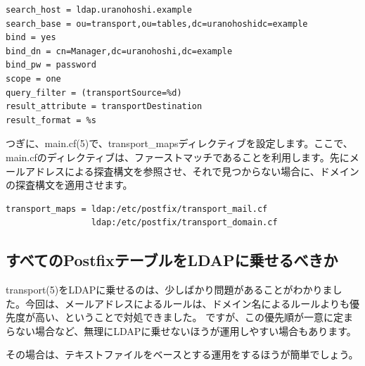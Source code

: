 \begin{verbatim}
search_host = ldap.uranohoshi.example
search_base = ou=transport,ou=tables,dc=uranohoshidc=example
bind = yes
bind_dn = cn=Manager,dc=uranohoshi,dc=example
bind_pw = password
scope = one
query_filter = (transportSource=%d)
result_attribute = transportDestination
result_format = %s
\end{verbatim}

つぎに、main.cf(5)で、transport\_mapsディレクティブを設定します。ここで、main.cfのディレクティブは、ファーストマッチであることを利用します。先にメールアドレスによる探査構文を参照させ、それで見つからない場合に、ドメインの探査構文を適用させます。

\begin{verbatim}
transport_maps = ldap:/etc/postfix/transport_mail.cf
                 ldap:/etc/postfix/transport_domain.cf
\end{verbatim}

\subsection{すべてのPostfixテーブルをLDAPに乗せるべきか}

transport(5)をLDAPに乗せるのは、少しばかり問題があることがわかりました。今回は、メールアドレスによるルールは、ドメイン名によるルールよりも優先度が高い、ということで対処できました。
ですが、この優先順が一意に定まらない場合など、無理にLDAPに乗せないほうが運用しやすい場合もあります。

その場合は、テキストファイルをベースとする運用をするほうが簡単でしょう。